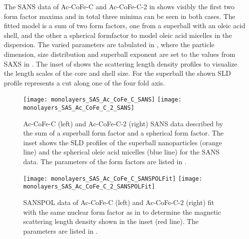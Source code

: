 \documentclass[\main/dresen_thesis.tex]{subfiles}
\begin{document}
    The SANS data of Ac-CoFe-C and Ac-CoFe-C-2 in  shows visibly the first two form factor maxima and in total three minima can be seen in both cases.
    The fitted model is a sum of two form factors, one from a superball with an oleic acid shell, and the other a spherical formfactor to model oleic acid micelles in the dispersion.
    The varied parameters are tabulated in , where the particle dimension, size distribution and superball exponent are set to the values from SAXS in .
    The inset of  shows the scattering length density profiles to visualize the length scales of the core and shell size.
    For the superball the shown SLD profile represents a cut along one of the four fold axis.

    \begin{figure}[!htbp]
      \centering
      \texttt{[image: monolayers\_SAS\_Ac\_CoFe\_C\_SANS]}
      \texttt{[image: monolayers\_SAS\_Ac\_CoFe\_C\_2\_SANS]}
      \caption{\label{fig:monolayers:nanoparticle:sans:superballAcAcFit}Ac-CoFe-C (left) and Ac-CoFe-C-2 (right) SANS data described by the sum of a superball form factor and a spherical form factor. The inset shows the SLD profiles of the superball nanoparticles (orange line) and the spherical oleic acid micelles (blue line) for the SANS data. The parameters of the form factors are listed in .}
    \end{figure}

    \begin{figure}[!htbp]
      \centering
      \texttt{[image: monolayers\_SAS\_Ac\_CoFe\_C\_SANSPOLFit]}
      \texttt{[image: monolayers\_SAS\_Ac\_CoFe\_C\_2\_SANSPOLFit]}
      \caption{\label{fig:monolayers:nanoparticle:sans:superballAcAcFit}SANSPOL data of Ac-CoFe-C (left) and Ac-CoFe-C-2 (right) fit with the same nuclear form factor as in  to determine the magnetic scattering length density  shown in the inset (red line). The parameters are listed in .}
    \end{figure}
\end{document}
